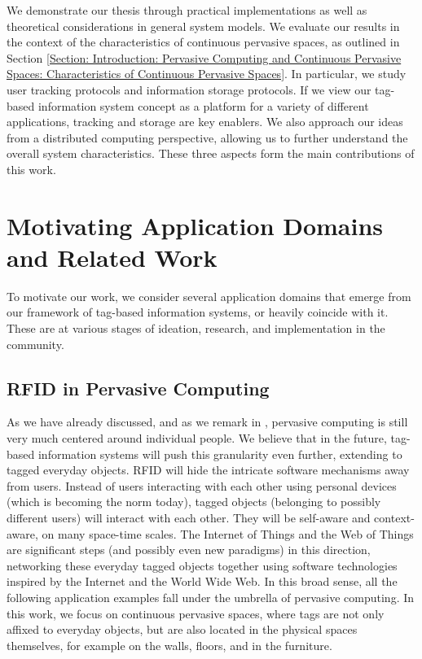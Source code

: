 We demonstrate our thesis through practical implementations as well as theoretical considerations in general system models. We evaluate our results in the context of the characteristics of continuous pervasive spaces, as outlined in Section \ref{Section: Introduction: Pervasive Computing and Continuous Pervasive Spaces: Characteristics of Continuous Pervasive Spaces}. In particular, we study user tracking protocols and information storage protocols. If we view our tag-based information system concept as a platform for a variety of different applications, tracking and storage are key enablers. We also approach our ideas from a distributed computing perspective, allowing us to further understand the overall system characteristics. These three aspects form the main contributions of this work.

\section{Motivating Application Domains and Related Work}
\label{Section: Introduction: Motivating Application Domains and Related Work}
To motivate our work, we consider several application domains that emerge from our framework of tag-based information systems, or heavily coincide with it. These are at various stages of ideation, research, and implementation in the community.

\subsection{RFID in Pervasive Computing}
\label{Section: Introduction: Motivating Application Domains and Related Work: RFID in Pervasive Computing}
As we have already discussed, and as we remark in \cite{2011 Wu}, pervasive computing is still very much centered around individual people. We believe that in the future, tag-based information systems will push this granularity even further, extending to tagged everyday objects. RFID will hide the intricate software mechanisms away from users. Instead of users interacting with each other using personal devices (which is becoming the norm today), tagged objects (belonging to possibly different users) will interact with each other. They will be self-aware and context-aware, on many space-time scales. The Internet of Things \cite{2011 Uckelmann} and the Web of Things \cite{2009 Guinard} are significant steps (and possibly even new paradigms) in this direction, networking these everyday tagged objects together using software technologies inspired by the Internet and the World Wide Web. In this broad sense, all the following application examples fall under the umbrella of pervasive computing. In this work, we focus on continuous pervasive spaces, where tags are not only affixed to everyday objects, but are also located in the physical spaces themselves, for example on the walls, floors, and in the furniture.

